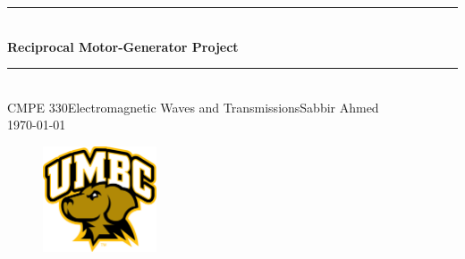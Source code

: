 \begin{titlepage}

    \newcommand{\HRule}{\rule{\linewidth}{0.6mm}}

    \center

    \HRule \\[1.5cm]
    {\huge \bfseries Reciprocal Motor-Generator Project}\\[0.5cm]
    \HRule \\[4.5cm]

    \large{CMPE 330\linebreak Electromagnetic Waves and Transmissions\linebreak Sabbir Ahmed}\\[3cm]

    {\large \today}\\[2cm]

    \begin{figure}[ht]
        \begin{center}
            \includegraphics[width=0.3\textwidth]{figures/uni_logo.jpg}
            \label{fig:uni_logo}
        \end{center}
    \end{figure}

    \vfill %

\end{titlepage}
